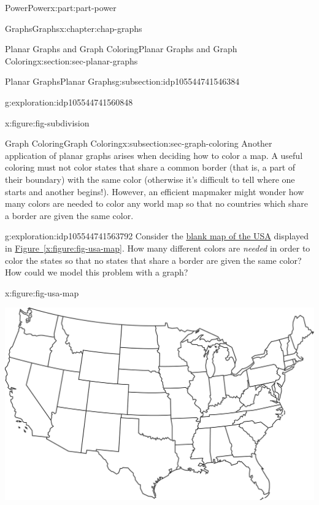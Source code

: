 \documentclass[oneside,10pt,]{book}
\newcommand{\xreffont}{\relax}
\numberwithin{equation}{section}
\begin{document}
\begin{partptx}{Power}{}{Power}{}{}{x:part:part-power}
\begin{chapterptx}{Graphs}{}{Graphs}{}{}{x:chapter:chap-graphs}
\begin{sectionptx}{Planar Graphs and Graph Coloring}{}{Planar Graphs and Graph Coloring}{}{}{x:section:sec-planar-graphs}
\begin{subsectionptx}{Planar Graphs}{}{Planar Graphs}{}{}{g:subsection:idp105544741546384}
\begin{exploration}{}{g:exploration:idp105544741560848}
\begin{figureptx}{}{x:figure:fig-subdivision}{}
\begin{image}{0.325}{0.35}{0.325}
\end{image}%
\tcblower
\end{figureptx}%
\end{exploration}%
\end{subsectionptx}
%
%
\typeout{************************************************}
\typeout{************************************************}
%
\begin{subsectionptx}{Graph Coloring}{}{Graph Coloring}{}{}{x:subsection:sec-graph-coloring}
Another application of planar graphs arises when deciding how to color a map. A useful coloring must not color states that share a common border (that is, a part of their boundary) with the same color (otherwise it’s difficult to tell where one starts and another begins!). However, an efficient mapmaker might wonder how many colors are needed to color any world map so that no countries which share a border are given the same color.%
\begin{exploration}{}{g:exploration:idp105544741563792}%
Consider the \href{./usa_map.pdf}{blank map of the USA} displayed in \hyperref[x:figure:fig-usa-map]{Figure~{\xreffont\ref{x:figure:fig-usa-map}}}. How many different colors are \emph{needed} in order to color the states so that no states that share a border are given the same color? How could we model this problem with a graph?%
\begin{figureptx}{}{x:figure:fig-usa-map}{}%
\begin{image}{0.175}{0.65}{0.175}%
\includegraphics[width=\linewidth]{./images/usa.jpg}
\end{image}%
\tcblower
\end{figureptx}%
\end{exploration}%


\end{subsectionptx}
\end{sectionptx}
\end{chapterptx}
\end{partptx}
\end{document}
